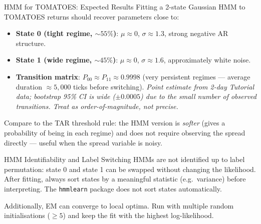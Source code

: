 \documentclass[12pt,a4paper,openany]{report}
\theoremstyle{definition}
\begin{document}
\begin{keyconceptbox}{HMM for TOMATOES: Expected Results}
Fitting a 2-state Gaussian HMM to TOMATOES returns should recover parameters close to:
\begin{itemize}
  \item \textbf{State 0 (tight regime, $\sim 55\%$)}: $\mu \approx 0$, $\sigma \approx 1.3$, strong negative AR structure.
  \item \textbf{State 1 (wide regime, $\sim 45\%$)}: $\mu \approx 0$, $\sigma \approx 1.6$, approximately white noise.
  \item \textbf{Transition matrix}: $P_{00} \approx P_{11} \approx 0.9998$ (very persistent regimes — average duration $\approx 5{,}000$ ticks before switching). \emph{Point estimate from 2-day Tutorial data; bootstrap 95\% CI is wide ($\pm 0.0005$) due to the small number of observed transitions. Treat as order-of-magnitude, not precise.}
\end{itemize}
Compare to the TAR threshold rule: the HMM version is \emph{softer} (gives a probability of being in each regime) and does not require observing the spread directly — useful when the spread variable is noisy.
\end{keyconceptbox}

\begin{warningbox}{HMM Identifiability and Label Switching}
HMMs are not identified up to label permutation: state 0 and state 1 can be swapped without changing the likelihood. After fitting, always sort states by a meaningful statistic (e.g.\ variance) before interpreting. The \texttt{hmmlearn} package does not sort states automatically.

Additionally, EM can converge to local optima. Run with multiple random initialisations ($\geq 5$) and keep the fit with the highest log-likelihood.
\end{warningbox}
\end{document}

